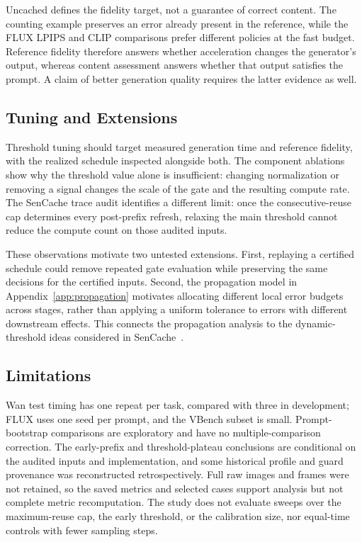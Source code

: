 \documentclass[10pt,twocolumn,letterpaper]{article}
\begin{document}
Uncached defines the fidelity target, not a guarantee of correct content.
The counting example preserves an error already present in the reference, while the FLUX LPIPS and CLIP comparisons prefer different policies at the fast budget.
Reference fidelity therefore answers whether acceleration changes the generator's output, whereas content assessment answers whether that output satisfies the prompt.
A claim of better generation quality requires the latter evidence as well.

\subsection{Tuning and Extensions}
Threshold tuning should target measured generation time and reference fidelity, with the realized schedule inspected alongside both.
The component ablations show why the threshold value alone is insufficient: changing normalization or removing a signal changes the scale of the gate and the resulting compute rate.
The SenCache trace audit identifies a different limit: once the consecutive-reuse cap determines every post-prefix refresh, relaxing the main threshold cannot reduce the compute count on those audited inputs.

These observations motivate two untested extensions.
First, replaying a certified schedule could remove repeated gate evaluation while preserving the same decisions for the certified inputs.
Second, the propagation model in Appendix~\ref{app:propagation} motivates allocating different local error budgets across stages, rather than applying a uniform tolerance to errors with different downstream effects.
This connects the propagation analysis to the dynamic-threshold ideas considered in SenCache~\cite{haghighi2026sencache}.

\subsection{Limitations}
Wan test timing has one repeat per task, compared with three in development; FLUX uses one seed per prompt, and the VBench subset is small.
Prompt-bootstrap comparisons are exploratory and have no multiple-comparison correction.
The early-prefix and threshold-plateau conclusions are conditional on the audited inputs and implementation, and some historical profile and guard provenance was reconstructed retrospectively.
Full raw images and frames were not retained, so the saved metrics and selected cases support analysis but not complete metric recomputation.
The study does not evaluate sweeps over the maximum-reuse cap, the early threshold, or the calibration size, nor equal-time controls with fewer sampling steps.
\end{document}
